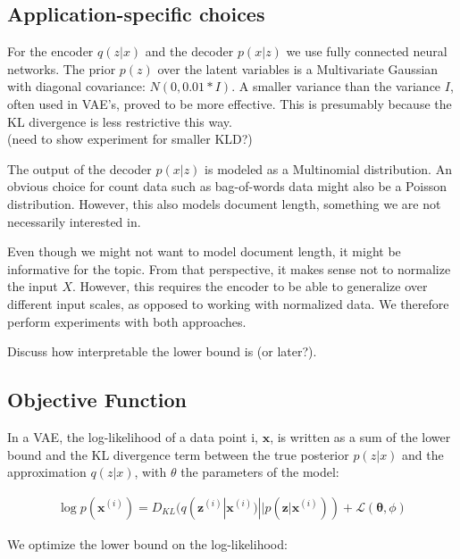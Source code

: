 \documentclass{report}
\begin{document}
	\subsection{Application-specific choices}
	
	For the encoder $q(z|x)$ and the decoder $p(x|z)$ we use fully connected neural networks. The prior $p(z)$ over the latent variables is a Multivariate Gaussian with diagonal covariance: $N(0,0.01*I)$. A smaller variance than the variance $I$, often used in VAE's, proved to be more effective. This is presumably because the KL divergence is less restrictive this way. 
	\\
	(need to show experiment for smaller KLD?)
	
	
	The output of the decoder $p(x|z)$ is modeled as a Multinomial distribution. An obvious choice for count data such as bag-of-words data might also be a Poisson distribution. However, this also models document length, something we are not necessarily interested in.  
	
	Even though we might not want to model document length, it might be informative for the topic. From that perspective, it makes sense not to normalize the input $X$. However, this requires the encoder to be able to generalize over different input scales, as opposed to working with normalized data. We therefore perform experiments with both approaches.
	
	Discuss how interpretable the lower bound is (or later?). 

	\subsection{Objective Function}
	
	In a VAE, the log-likelihood of a data point i, $\mathbf{x}$, is written as a sum of the lower bound and the KL divergence term between the true posterior $p(z|x)$ and the approximation $q(z|x)$, with $\theta$ the parameters of the model:
	
	\begin{align*}
	\log p(\mathbf{x}^{(i)}) = D_{KL}(q(\mathbf{z}^{(i)}|\mathbf{x}^{(i)}) || p(\mathbf{z}|\mathbf{x}^{(i)})) + \mathcal{L}(\mathbf{\theta}, \phi)
	\end{align*}
	
	We optimize the lower bound on the log-likelihood: 
	
	\begin{align}
	\end{align}
	
\end{document}
